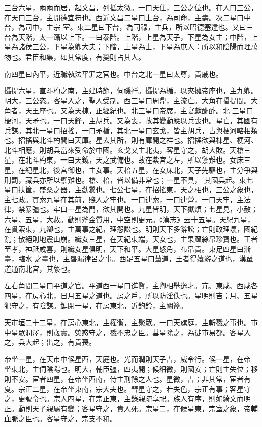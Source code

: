 \begin{pinyinscope}
{{ 三台六星，兩兩而居，起文昌，列抵太微。一曰天住，三公之位也。在人曰三公，在天曰三台，主開德宜符也。西近文昌二星曰上台，為司命，主壽。次二星曰中台，為司中，主宗
 室。東二星曰下台，為司祿，主兵，所以昭德塞違也。又曰三台為天階，太一躡以上下。一曰泰階。上階，上星為天子，下星為女主；中階，上星為諸侯三公，下星為卿大夫；下階，上星為士，下星為庶人：所以和陰陽而理萬物也。君臣和集，如其常度，有變則占其人。



 南四星曰內平，近職執法平罪之官也。中台之北一星曰太尊，貴戚也。



 攝提六星，直斗杓之南，主建時節，伺禨祥。攝提為楯，以夾擁帝座也，主九卿。明大，三公恣。客星入之，聖人受制。西三星曰周鼎，主流亡。大角在攝提間。大角者，天王座也。又為天棟，正經紀也。北三星曰帝席，主宴獻酬酢。北
 三星曰梗河，天矛也。一曰天鋒，主胡兵。又為喪，故其變動應以兵喪也。星亡，其國有兵謀。其北一星曰招搖，一曰矛楯，其北一星曰玄戈，皆主胡兵，占與梗河略相類也。招搖與北斗杓間曰天庫。星去其所，則有庫開之祥也。招搖欲與棟星、梗河、北斗相應，則胡兵當來受命於中國。玄戈又主北夷，客星守之，胡大敗。天槍三星，在北斗杓東，一曰天鉞，天之武備也。故在紫宮之左，所以禦難也。女床三星，在紀星北，後宮御也，主女事。天棓五星，在女床北，天子先驅也，主分爭與刑罰，藏兵亦所以禦難也。槍、棓，皆以備非常也；一星不具，
 其國兵起。東七星曰扶筐，盛桑之器，主勸蠶也。七公七星，在招搖東，天之相也，三公之象也，主七政。貫索九星在其前，賤人之牢也。一曰連索，一曰連營，一曰天牢，主法律，禁暴彊也。牢口一星為門，欲其開也。九星皆明，天下獄煩；七星見，小赦；六星、五星，大赦。動則斧金質用，中空則更元。《漢志》云十五星。天紀九星，在貫索東，九卿也，主萬事之紀，理怨訟也。明則天下多辭訟；亡則政理壞，國紀亂；散絕則地震山崩。織女三星，在天紀東端，天女也，主果蓏絲帛珍寶也。王者至孝，神祗咸喜，則織女星俱明，天下和平。大星怒角，布帛貴。東足四星曰漸臺，臨水
 之臺也，主晷漏律呂之事。西足五星曰輦道，王者得嬉游之道也，漢輦道通南北宮，其象也。



 左右角間二星曰平道之官。平道西一星曰進賢，主卿相舉逸才。亢、東咸、西咸各四星，在房心北，日月五星之道也。房之戶，所以防淫佚也。星明則吉；月、五星犯守之，有陰謀。鍵閉一星，在房東北，近鉤鈐，主關籥。



 天市垣二十二星，在房心東北，主權衡，主聚眾。一曰天旗庭，主斬戮之事也。市中星眾潤澤，則歲實。熒惑守之，戮不忠之臣。彗星除之，為徙市易都。客星入之，兵大起；出之，有貴喪。



 帝坐一星，在天市中候星西，天庭也。光而潤則天子吉，威令行。候一星，在帝
 坐東北，主伺陰陽也。明大，輔臣彊，四夷開；候細微，則國安；亡則主失位；移則不安。宦者四星，在帝坐西南，侍主刑餘之人也。星微，吉；非其常，宦者有夏。宗正二星，在帝坐東南，宗大夫也。彗星守之，若失色，宗正有事；客星守之，更號令也。宗人四星，在宗正東，主錄親疏享祀。族人有序，則如綺文而明正。動則天子親屬有變；客星守之，貴人死。宗星二，在候星東，宗室之象，帝輔血脈之臣也。客星守之，宗支不和。



}}
\end{pinyinscope}
